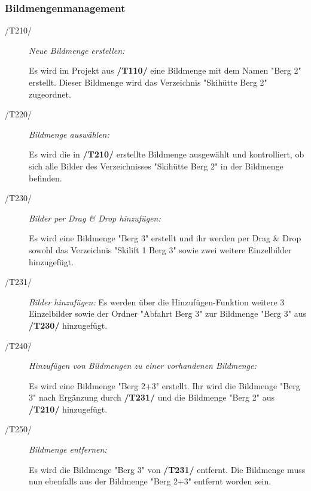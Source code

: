 	\subsubsection{Bildmengenmanagement}
		
		\begin{description}
		
			\item[/T210/] \textit{Neue Bildmenge erstellen:}\par Es wird im Projekt aus \textbf{/T110/} eine Bildmenge mit dem Namen "Berg 2" erstellt. Dieser Bildmenge wird das Verzeichnis "Skihütte Berg 2" zugeordnet.
				
			\item[/T220/] \textit{Bildmenge auswählen:}\par Es wird die in \textbf{/T210/} erstellte Bildmenge ausgewählt und kontrolliert, ob sich alle Bilder des Verzeichnisses "Skihütte Berg 2" in der Bildmenge befinden.

			\item[/T230/] \textit{Bilder per Drag \& Drop hinzufügen:}\par Es wird eine Bildmenge "Berg 3" erstellt und ihr werden per Drag \& Drop sowohl das Verzeichnis "Skilift 1 Berg 3" sowie zwei weitere Einzelbilder hinzugefügt.
			
			\item[/T231/] \textit{Bilder hinzufügen:} Es werden über die Hinzufügen-Funktion weitere 3 Einzelbilder sowie der Ordner "Abfahrt Berg 3" zur Bildmenge "Berg 3" aus \textbf{/T230/} hinzugefügt.
			
			\item[/T240/] \textit{Hinzufügen von Bildmengen zu einer vorhandenen Bildmenge:}\par Es wird eine Bildmenge "Berg 2+3" erstellt. Ihr wird die Bildmenge "Berg 3" nach Ergänzung durch \textbf{/T231/} und die Bildmenge "Berg 2" aus \textbf{/T210/} hinzugefügt.
				
			\item[/T250/] \textit{Bildmenge entfernen:}\par Es wird die Bildmenge "Berg 3" von \textbf{/T231/} entfernt. Die Bildmenge muss nun ebenfalls aus der Bildmenge "Berg 2+3" entfernt worden sein.
			

\end{description}
